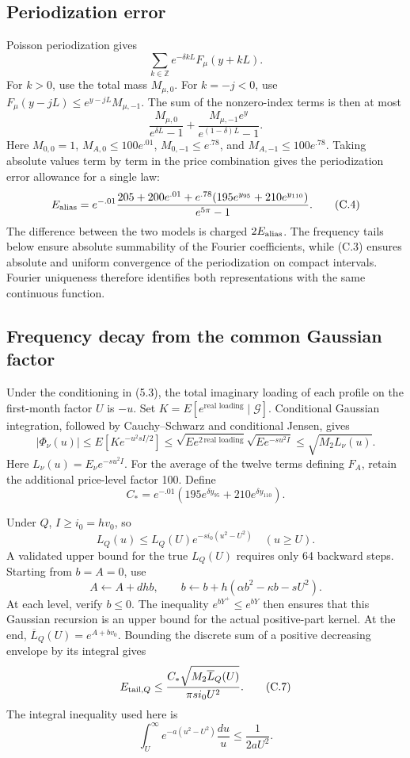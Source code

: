 \documentclass[11pt,a4paper]{article}
\begin{document}
\subsection{Periodization error}

Poisson periodization gives
\[
\sum_{k\in\mathbb Z}e^{-\delta kL}F_\mu(y+kL).
\]
For \(k>0\), use the total mass \(M_{\mu,0}\). For \(k=-j<0\), use \(F_\mu(y-jL)\le e^{y-jL}M_{\mu,-1}\). The sum of the nonzero-index terms is then at most
\[
\frac{M_{\mu,0}}{e^{\delta L}-1}
+\frac{M_{\mu,-1}e^y}{e^{(1-\delta)L}-1}.
\tag{C.3}
\]
Here \(M_{0,0}=1\), \(M_{A,0}\le100e^{.01}\), \(M_{0,-1}\le e^{.78}\), and \(M_{A,-1}\le100e^{.78}\). Taking absolute values term by term in the price combination gives the periodization error allowance for a single law:
\[
E_{\rm alias}=
e^{-.01}\frac{
205+200e^{.01}
+e^{.78}(195e^{y_{95}}+210e^{y_{110}})
}{e^{5\pi}-1}.
\tag{C.4}
\]
The difference between the two models is charged \(2E_{\rm alias}\). The frequency tails below ensure absolute summability of the Fourier coefficients, while (C.3) ensures absolute and uniform convergence of the periodization on compact intervals. Fourier uniqueness therefore identifies both representations with the same continuous function.

\subsection{Frequency decay from the common Gaussian factor}

Under the conditioning in (5.3), the total imaginary loading of each profile on the first-month factor \(U\) is \(-u\). Set \(K=E[e^{\text{real loading}}\mid\mathcal G]\). Conditional Gaussian integration, followed by Cauchy--Schwarz and conditional Jensen, gives
\[
|\Phi_\nu(u)|
\le E[K e^{-u^2sI/2}]
\le\sqrt{E e^{2\,\text{real loading}}}
\sqrt{E e^{-su^2I}}
\le\sqrt{M_2L_\nu(u)}.
\tag{C.5}
\]
Here \(L_\nu(u)=E_\nu e^{-su^2I}\). For the average of the twelve terms defining \(F_A\), retain the additional price-level factor 100. Define
\[
C_*=
e^{-.01}\left(195e^{\delta y_{95}}+210e^{\delta y_{110}}\right).
\]

Under \(Q\), \(I\ge i_0=hv_0\), so
\[
L_Q(u)\le L_Q(U)e^{-si_0(u^2-U^2)}\quad(u\ge U).
\]
A validated upper bound for the true \(L_Q(U)\) requires only 64 backward steps. Starting from \(b=A=0\), use
\[
A\leftarrow A+dhb,\qquad
b\leftarrow b+h(\alpha b^2-\kappa b-sU^2).
\tag{C.6}
\]
At each level, verify \(b\le0\). The inequality \(e^{bY^+}\le e^{bY}\) then ensures that this Gaussian recursion is an upper bound for the actual positive-part kernel. At the end, \(\overline L_Q(U)=e^{A+bv_0}\). Bounding the discrete sum of a positive decreasing envelope by its integral gives
\[
E_{{\rm tail},Q}\le
\frac{C_*\sqrt{M_2\overline L_Q(U)}}{\pi s i_0U^2}.
\tag{C.7}
\]
The integral inequality used here is
\[
\int_U^\infty e^{-a(u^2-U^2)}\frac{du}{u}\le\frac1{2aU^2}.
\]
\end{document}
